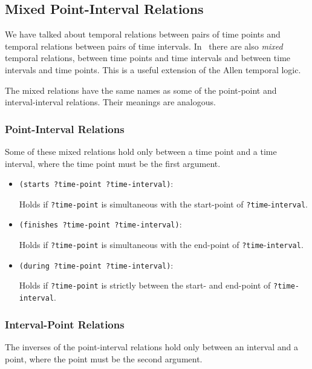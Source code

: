\subsection{Mixed Point-Interval Relations}
\label{subsec-temporal-point-interval}

We have talked about temporal relations between pairs of time points and
temporal relations between pairs of time intervals.  In \snark\  there are
also {\em mixed} temporal relations, between time points and time intervals
and between time intervals and time points.  This is a useful extension of the
Allen temporal logic.

The mixed relations have the same names as some of the point-point and
interval-interval relations.  Their meanings are analogous.

\subsubsection{Point-Interval Relations}
Some of these mixed relations hold only between a time point and a time
interval, where the time point must be the first argument.

\begin{itemize}

\item{\verb'(starts ?time-point ?time-interval)':}

 Holds if {\tt ?time-point} is simultaneous with the start-point of
 {\tt ?time}-{\tt interval}.

\item{\verb'(finishes ?time-point ?time-interval)':}

 Holds if {\tt ?time-point} is simultaneous with the end-point of
 {\tt ?time}-{\tt interval}.

\item{\verb'(during ?time-point ?time-interval)':}

 Holds if {\tt ?time-point} is strictly between the start- and end-point of
 {\tt ?time-interval}.
\end{itemize}

\subsubsection{Interval-Point Relations}
The inverses of the point-interval relations hold only between an interval
and a point, where the point must be the second argument.

